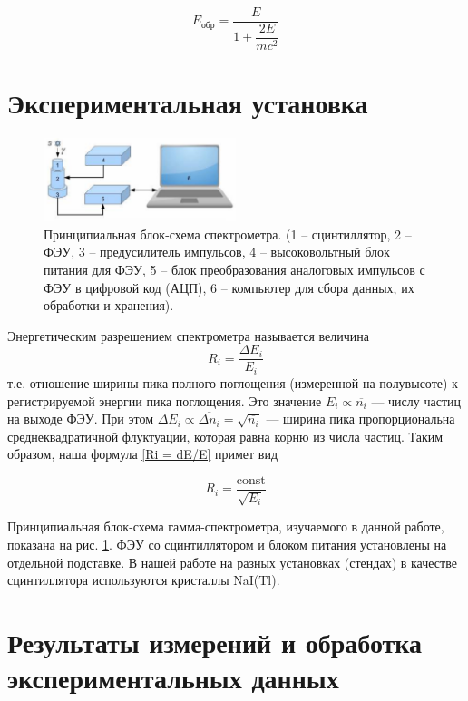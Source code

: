 \documentclass[a4paper,12pt]{article} %
\begin{document}
\begin{equation}\label{Eobr}
    E_\text{обр} = \dfrac{E}{1 + \dfrac{2E}{mc^2}}
\end{equation}

\section{Экспериментальная установка}
\begin{figure}
    \centering
    \includegraphics[width=0.5\textwidth]{setup.png}
    \caption{Принципиальная блок-схема спектрометра. (1 – сцинтиллятор, 2 – ФЭУ, 3 – предусилитель импульсов, 4 – высоковольтный блок питания для ФЭУ, 5 – блок преобразования аналоговых импульсов с ФЭУ в цифровой код (АЦП), 6 – компьютер для сбора данных, их обработки и хранения).}
    \label{fig:setup}
\end{figure}

Энергетическим разрешением спектрометра называется величина	
\begin{equation}\label{Ri = dE/E}
    R_i = \dfrac{\Delta E_i}{E_i}
\end{equation}
т.е. отношение ширины пика полного поглощения (измеренной на полувысоте) к регистрируемой энергии пика поглощения. Это значение $ E_i \propto \overline{n_i} $ --- числу частиц на выходе ФЭУ. При этом  $ \Delta E_i \propto \overline{\Delta n_i} = \sqrt{\overline{n_i}} $ --- ширина пика пропорциональна среднеквадратичной флуктуации, которая равна корню из числа частиц. Таким образом, наша формула \eqref{Ri = dE/E} примет вид
	
\begin{equation}\label{Ri = c/E}
    R_i = \dfrac{\mathrm{const}}{\sqrt{E_i}}
\end{equation}

Принципиальная блок-схема гамма-спектрометра, изучаемого в данной
работе, показана на рис. \ref{fig:setup}. ФЭУ со сцинтиллятором и блоком питания установлены на отдельной подставке. В нашей работе на разных установках (стендах) в качестве сцинтиллятора используются кристаллы NaI(Tl).

\newpage
\section{Результаты измерений и обработка экспериментальных данных}
\end{document}

